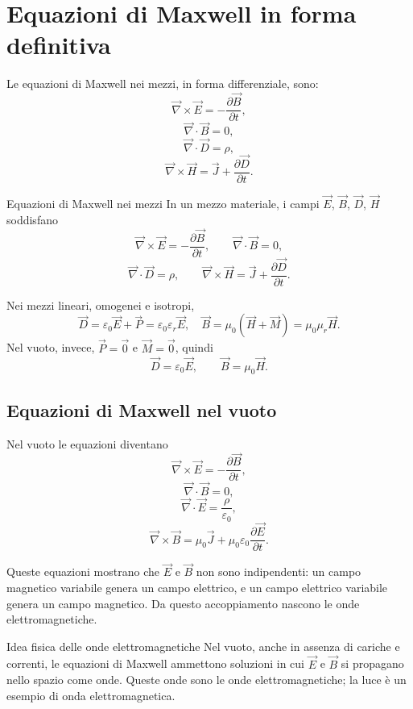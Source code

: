 \documentclass[a4paper]{article}
\begin{document}
\section{Equazioni di Maxwell in forma definitiva}

Le equazioni di Maxwell nei mezzi, in forma differenziale, sono:
\[
\vec{\nabla}\times\vec{E}=-\frac{\partial\vec{B}}{\partial t},
\]
\[
\vec{\nabla}\cdot\vec{B}=0,
\]
\[
\vec{\nabla}\cdot\vec{D}=\rho,
\]
\[
\vec{\nabla}\times\vec{H}=\vec{J}+\frac{\partial\vec{D}}{\partial t}.
\]

\begin{snippettheorem}{Equazioni di Maxwell nei mezzi}
In un mezzo materiale, i campi \(\vec{E}\), \(\vec{B}\), \(\vec{D}\), \(\vec{H}\) soddisfano
\[
    \vec{\nabla}\times\vec{E}=-\frac{\partial\vec{B}}{\partial t},
    \qquad
    \vec{\nabla}\cdot\vec{B}=0,
\]
\[
    \vec{\nabla}\cdot\vec{D}=\rho,
    \qquad
    \vec{\nabla}\times\vec{H}=\vec{J}+\frac{\partial\vec{D}}{\partial t}.
\]
\end{snippettheorem}

Nei mezzi lineari, omogenei e isotropi,
\[
\vec{D}=\varepsilon_0\vec{E}+\vec{P}=\varepsilon_0\varepsilon_r\vec{E},
\quad
\vec{B}=\mu_0\left(\vec{H}+\vec{M}\right)=\mu_0\mu_r\vec{H}.
\]
Nel vuoto, invece, \(\vec{P}=\vec{0}\) e \(\vec{M}=\vec{0}\), quindi
\[
\vec{D}=\varepsilon_0\vec{E},
\qquad
\vec{B}=\mu_0\vec{H}.
\]

\subsection{Equazioni di Maxwell nel vuoto}

Nel vuoto le equazioni diventano
\[
\vec{\nabla}\times\vec{E}=-\frac{\partial\vec{B}}{\partial t},
\]
\[
\vec{\nabla}\cdot\vec{B}=0,
\]
\[
\vec{\nabla}\cdot\vec{E}=\frac{\rho}{\varepsilon_0},
\]
\[
\vec{\nabla}\times\vec{B}=\mu_0\vec{J}+\mu_0\varepsilon_0\frac{\partial\vec{E}}{\partial t}.
\]

Queste equazioni mostrano che \(\vec{E}\) e \(\vec{B}\) non sono indipendenti: un campo magnetico variabile genera un campo elettrico, e un campo elettrico variabile genera un campo magnetico. Da questo accoppiamento nascono le onde elettromagnetiche.

\begin{snippetproposition}{Idea fisica delle onde elettromagnetiche}
Nel vuoto, anche in assenza di cariche e correnti, le equazioni di Maxwell ammettono soluzioni in cui \(\vec{E}\) e \(\vec{B}\) si propagano nello spazio come onde. Queste onde sono le onde elettromagnetiche; la luce è un esempio di onda elettromagnetica.
\end{snippetproposition}
\end{document}
